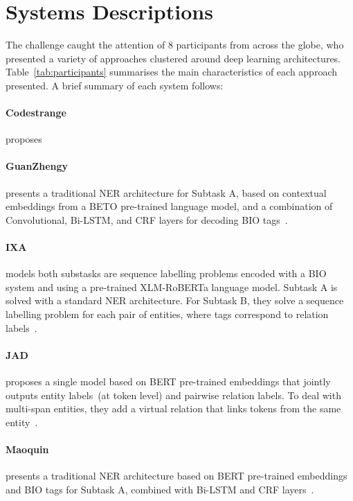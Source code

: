 \documentclass[a4paper,11pt,twocolumn,twoside]{article}
\begin{document}
\section{Systems Descriptions}\label{sec:systems}

The challenge caught the attention of 8 participants from across the globe,
who presented a variety of approaches clustered around deep learning architectures.
Table~\ref{tab:participants} summarises the main characteristics of each approach presented.
A brief summary of each system follows:

  \paragraph{Codestrange} proposes

  \paragraph{GuanZhengy} presents a traditional NER architecture for Subtask A, based on contextual embeddings from a BETO pre-trained language model, and a combination of Convolutional, Bi-LSTM, and CRF layers for decoding BIO tags~\cite{GuanZhengyi2021}.

  \paragraph{IXA} models both substasks are sequence labelling problems encoded with a BIO system and using a pre-trained XLM-RoBERTa language model. Subtask A is solved with a standard NER architecture. For Subtask B, they solve a sequence labelling problem for each pair of entities, where tags correspond to relation labels~\cite{edgarandres2021}.

  \paragraph{JAD} proposes a single model based on BERT pre-trained embeddings that jointly outputs entity labels~(at token level) and pairwise relation labels. To deal with multi-span entities, they add a virtual relation that links tokens from the same entity~\cite{JAD2021}.

  \paragraph{Maoquin} presents a traditional NER architecture based on BERT pre-trained embeddings and BIO tags for Subtask A, combined with Bi-LSTM and CRF layers~\cite{Maoqin2021}.
\end{document}
